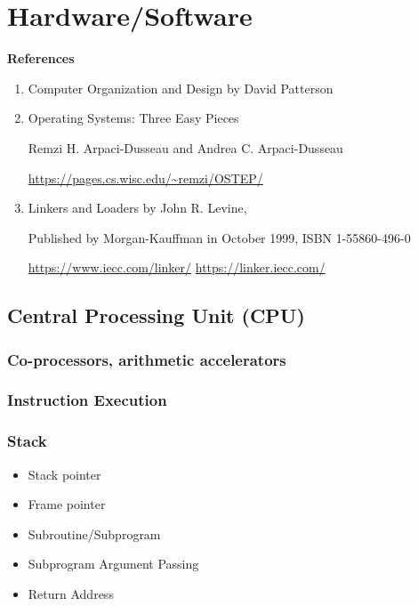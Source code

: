 \documentclass[12pt,a4paper]{article}
\begin{document}
\section{Hardware/Software}

\textbf{References}

\begin{enumerate}
\item Computer Organization and Design by David Patterson
\item Operating Systems: Three Easy Pieces

    Remzi H. Arpaci-Dusseau and Andrea C. Arpaci-Dusseau

    \url{https://pages.cs.wisc.edu/~remzi/OSTEP/}

\item Linkers and Loaders by John R. Levine,

    Published by Morgan-Kauffman in October 1999, ISBN 1-55860-496-0

    \url{https://www.iecc.com/linker/}
    \url{https://linker.iecc.com/}

\end{enumerate}

\subsection{Central Processing Unit (CPU)}

\subsubsection{Co-processors, arithmetic accelerators}

\subsubsection{Instruction Execution}

\subsubsection{Stack}

\begin{itemize}
\item Stack pointer
\item Frame pointer
\item Subroutine/Subprogram
\item Subprogram Argument Passing
\item Return Address
\end{itemize}
\end{document}
